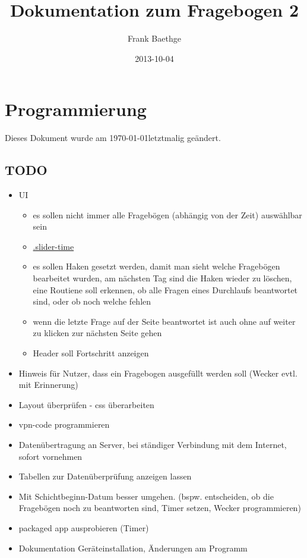 \documentclass[a4paper]{scrartcl}
\title{Dokumentation zum Fragebogen 2}
\author{Frank Baethge}
\date{2013-10-04}
\begin{document}
	\section{Programmierung}
	Dieses Dokument wurde am \today letztmalig geändert.

		\subsection{TODO}
			\begin{itemize}
				\item UI
					\begin{itemize}
						\item es sollen nicht immer alle Fragebögen (abhängig von der Zeit) auswählbar sein
						\item \href{http://stackoverflow.com/questions/2279784/jquery-ui-slider-for-time}{.slider-time}
						\item es sollen Haken gesetzt werden, damit man sieht welche Fragebögen bearbeitet wurden, am nächsten Tag sind die Haken wieder zu löschen, eine Routiene soll erkennen, ob alle Fragen eines Durchlaufs beantwortet sind, oder ob noch welche fehlen
						\item wenn die letzte Frage auf der Seite beantwortet ist auch ohne auf weiter zu klicken zur nächsten Seite gehen
						\item Header soll Fortschritt anzeigen
					\end{itemize}
				\item Hinweis für Nutzer, dass ein Fragebogen ausgefüllt werden soll (Wecker evtl. mit Erinnerung)
				\item Layout überprüfen - css überarbeiten
				\item vpn-code programmieren
				\item Datenübertragung an Server, bei ständiger Verbindung mit dem Internet, sofort vornehmen
				\item Tabellen zur Datenüberprüfung anzeigen lassen
				\item Mit Schichtbeginn-Datum besser umgehen. (bspw. entscheiden, ob die Fragebögen noch zu beantworten sind, Timer setzen, Wecker programmieren)
				\item packaged app ausprobieren (Timer)
				\item Dokumentation Geräteinstallation, Änderungen am Programm
			\end{itemize}
\end{document}

